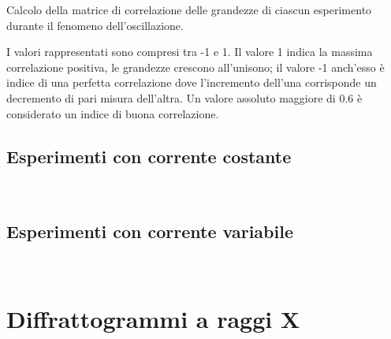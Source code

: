 \documentclass[11pt]{article}
\begin{document}
    Calcolo della matrice di correlazione delle grandezze di ciascun
esperimento durante il fenomeno dell'oscillazione.

I valori rappresentati sono compresi tra -1 e 1. Il valore 1 indica la
massima correlazione positiva, le grandezze crescono all'unisono; il
valore -1 anch'esso è indice di una perfetta correlazione dove
l'incremento dell'una corrisponde un decremento di pari misura
dell'altra. Un valore assoluto maggiore di 0.6 è considerato un indice
di buona correlazione.

    \hypertarget{esperimenti-con-corrente-costante}{%
\subsection{Esperimenti con corrente
costante}\label{esperimenti-con-corrente-costante}}

    \begin{center}
    \end{center}
    { \hspace*{\fill} \\}
    
    \hypertarget{esperimenti-con-corrente-variabile}{%
\subsection{Esperimenti con corrente
variabile}\label{esperimenti-con-corrente-variabile}}


    \begin{center}
    \end{center}
    { \hspace*{\fill} \\}
    
    \hypertarget{Diffrattogrammi_a_raggi_X}{%
\section{Diffrattogrammi a raggi X}\label{Diffrattogrammi_a_raggi_X}}

    \begin{center}
    \end{center}
    { \hspace*{\fill} \\}

    
    
    
\end{document}
